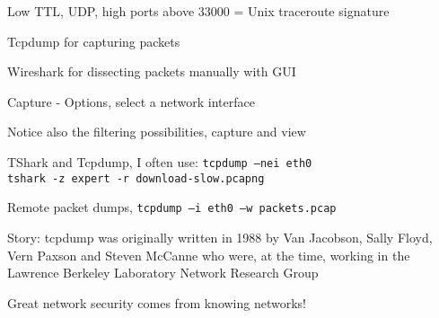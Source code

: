 \documentclass[Screen16to9,17pt]{foils}
\begin{document}
\vskip 5mm
\centerline{Low TTL, UDP, high ports above 33000 = Unix traceroute signature}



\begin{list1}
\item Tcpdump for capturing packets
\item Wireshark for dissecting packets manually with GUI
\end{list1}






\centerline{}



\centerline{Capture - Options, select a network interface}



\centerline{Notice also the filtering possibilities, capture and view}






\begin{list2}
\item TShark and Tcpdump, I often use: \verb+tcpdump –nei eth0+\\
\verb+tshark -z expert -r download-slow.pcapng+

\item Remote packet dumps, \verb+tcpdump –i eth0 –w packets.pcap+

\item Story: tcpdump was originally written in 1988 by Van Jacobson, Sally Floyd, Vern Paxson and Steven McCanne who were, at the time, working in the Lawrence Berkeley Laboratory Network Research Group\\
\end{list2}

\vskip 5mm

\centerline{\Large Great network security comes from knowing networks!}
\end{document}
